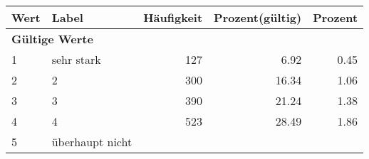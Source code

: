      \begin{longtable}{lXrrr}
     \toprule
     \textbf{Wert} & \textbf{Label} & \textbf{Häufigkeit} & \textbf{Prozent(gültig)} & \textbf{Prozent} \\
     \endhead
     \midrule
     \multicolumn{5}{l}{\textbf{Gültige Werte}}\\

     1 &
     \multicolumn{1}{X}{ sehr stark   } &


       \num{127} &
       \num[round-mode=places,round-precision=2]{6,92} &
         \num[round-mode=places,round-precision=2]{0,45} \\

     2 &
     \multicolumn{1}{X}{ 2   } &


       \num{300} &
       \num[round-mode=places,round-precision=2]{16,34} &
         \num[round-mode=places,round-precision=2]{1,06} \\

     3 &
     \multicolumn{1}{X}{ 3   } &


       \num{390} &
       \num[round-mode=places,round-precision=2]{21,24} &
         \num[round-mode=places,round-precision=2]{1,38} \\

     4 &
     \multicolumn{1}{X}{ 4   } &


       \num{523} &
       \num[round-mode=places,round-precision=2]{28,49} &
         \num[round-mode=places,round-precision=2]{1,86} \\

     5 &
     \multicolumn{1}{X}{ überhaupt nicht   } &



\end{longtable}
